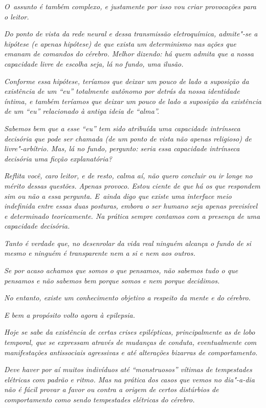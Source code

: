 \emph{O~assunto é também complexo, e justamente por isso vou criar
provocações para o leitor.}~

\emph{Do ponto de vista da rede neural e dessa transmissão
eletroquímica, admite"-se a hipótese (e apenas hipótese) de que exista um
determinismo nas ações que emanam de comandos do cérebro. Melhor
dizendo: há quem admita que a nossa capacidade livre de escolha seja, lá
no fundo, uma ilusão.}~

\emph{Conforme essa hipótese, teríamos que deixar um pouco de lado a
suposição da existência de um ``eu'' totalmente autônomo por detrás da
nossa identidade íntima, e também teríamos que deixar um pouco de lado a
suposição da existência de um ``eu'' relacionado à antiga ideia de
``alma''.}~

\emph{Sabemos bem que a esse ``eu'' tem sido atribuída uma capacidade
intrínseca decisória que pode ser chamada (de um ponto de vista não
apenas religioso) de livre"-arbítrio. Mas, lá no fundo, pergunto: seria
essa capacidade intrínseca decisória uma ficção explanatória?}~

\emph{Reflita você, caro leitor, e de resto, calma aí, não quero
concluir ou ir longe no mérito dessas questões. Apenas provoco. Estou
ciente de que há os que respondem sim ou não a essa pergunta. E~ainda
digo que existe uma interface meio indefinida entre essas duas posturas,
embora o ser humano seja apenas previsível e determinado teoricamente.
Na prática sempre contamos com a presença de uma capacidade decisória.}~

\emph{Tanto é verdade que, no desenrolar da vida real ninguém alcança o
fundo de si mesmo e ninguém é transparente nem a si e nem aos outros.}~

\emph{Se por acaso achamos que somos o que pensamos, não sabemos tudo o
que pensamos e não sabemos bem porque somos e nem porque decidimos.}~

\emph{No entanto, existe um conhecimento objetivo a respeito da mente e
do cérebro.}~

\emph{E bem a propósito volto agora à epilepsia.}~

\emph{Hoje se sabe da existência de certas crises epilépticas,
principalmente as de lobo temporal, que se expressam através de mudanças
de conduta, eventualmente com manifestações antissociais agressivas e
até alterações bizarras de comportamento.}~

\emph{Deve haver por aí muitos indivíduos até ``monstruosos'' vítimas de
tempestades elétricas com padrão e ritmo. Mas na prática dos casos que
vemos no dia"-a-dia não é fácil provar a favor ou contra a origem de
certos distúrbios de comportamento como sendo tempestades elétricas do
cérebro.}~

